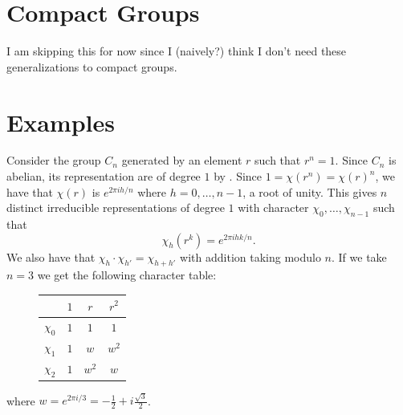 \documentclass[letterpaper, 11pt, oneside]{book}
\begin{document}
\chapter{Compact Groups}

\begin{danger}
  I am skipping this for now since I (naively?) think I don't need these generalizations to compact groups.
\end{danger}

\chapter{Examples}

\begin{ex}\label{ex:char_table_Cn}
  Consider the group $C_{n}$ generated by an element $r$ such that $r^{n} = 1$.
  Since $C_{n}$ is abelian, its representation are of degree $1$ by .
  Since $1 = \chi(r^{n}) = \chi(r)^{n}$, we have that $\chi(r)$ is $e^{2 \pi i h / n}$ where $h = 0, \ldots, n - 1$, a root of unity.
  This gives $n$ distinct irreducible representations of degree $1$ with character $\chi_{0}, \ldots, \chi_{n - 1}$ such that
  \[
    \chi_{h}(r^{k}) = e^{2 \pi i h k / n}.
  \]
  We also have that $\chi_{h} \cdot \chi_{h'} = \chi_{h + h'}$ with addition taking modulo $n$.
  If we take $n = 3$ we get the following character table:
  \begin{figure}[h]
    \centering
    \begin{tabular}{l|ccc}
               & $1$ & $r$ & $r^2$ \\\hline
      $\chi_0$ & $1$ & $1$ & $1$ \\
      $\chi_1$ & $1$ & $w$ & $w^2$ \\
      $\chi_2$ & $1$ & $w^2$ & $w$
    \end{tabular}
  \end{figure}
  where $w = e^{2\pi i / 3} = -\frac{1}{2} + i \frac{\sqrt{3}}{2}$.
\end{ex}
\end{document}
